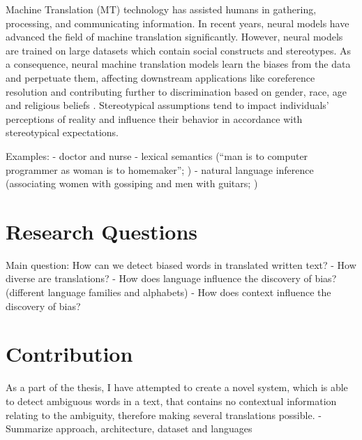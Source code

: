 Machine Translation (MT) technology has assisted humans in gathering, processing, and communicating information. In recent years, neural models have advanced the field of machine translation significantly. However, neural models are trained on large datasets which contain social constructs and stereotypes. As a consequence, neural machine translation models learn the biases from the data and perpetuate them, affecting downstream applications like coreference resolution \parencite{Zhao_2018_coreference} and contributing further to discrimination based on gender, race, age and religious beliefs \parencite{Rudinger_2017}. Stereotypical assumptions tend to impact individuals' perceptions of reality and influence their behavior in accordance with stereotypical expectations.

Examples:
- doctor and nurse \parencite{Escud_Font_2019}
- lexical semantics (“man is to computer programmer as woman is to homemaker”; \cite{bolukbasi2016man})
- natural language inference (associating women with gossiping and men with guitars; \cite{Rudinger_2017})

\section{Research Questions}
\label{sec:Introduction:Questions}


Main question: How can we detect biased words in translated written text?
-	How diverse are translations?
-	How does language influence the discovery of bias? (different language families and alphabets)
-	How does context influence the discovery of bias? 


\section{Contribution}
\label{sec:Introduction:Contribution}

As a part of the thesis, I have attempted to create a novel system, which is able to detect ambiguous words in a text, that contains no contextual information relating to the ambiguity, therefore making several translations possible. 
- Summarize approach, architecture, dataset and languages 


